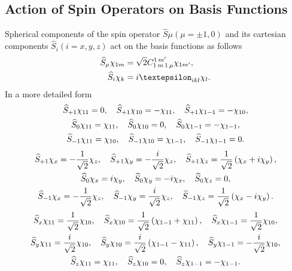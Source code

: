 \subsection{Action of Spin Operators on Basis Functions}\label{sec:6.3.3}
Spherical components of the spin operator $\widehat{S} \mu(\mu= \pm 1,0)$ and its cartesian components $\widehat{S}_{i}(i=x, y, z)$ act on the basis functions as follows
\begin{align}
\widehat{S}_{\mu} \chi_{1 m} & =\sqrt{2} \clebsch{1}{m}{1}{\mu}{1}{m^{\prime}} \chi_{1 m^{\prime}}, \label{eq:6:3:24}\\
\widehat{S}_{i} \chi_{k} & =i \varepsilon_{i k l} \chi_{l} . \notag
\end{align}
In a more detailed form
\begin{gather}
\widehat{S}_{+1} \chi_{11}=0, \quad \widehat{S}_{+1} \chi_{10}=-\chi_{11}, \quad \widehat{S}_{+1} \chi_{1-1}=-\chi_{10}, \notag\\
\widehat{S}_{0} \chi_{11}=\chi_{11}, \quad \widehat{S}_{0} \chi_{10}=0, \quad \widehat{S}_{0} \chi_{1-1}=-\chi_{1-1}, \label{eq:6:3:25}\\
\widehat{S}_{-1} \chi_{11}=\chi_{10}, \quad \widehat{S}_{-1} \chi_{10}=\chi_{1-1}, \quad \widehat{S}_{-1} \chi_{1-1}=0 . \notag
\end{gather}
\begin{gather}
\widehat{S}_{+1} \chi_{x}=-\frac{1}{\sqrt{2}} \chi_{z}, \quad \widehat{S}_{+1} \chi_{y}=-\frac{i}{\sqrt{2}} \chi_{z}, \quad \widehat{S}_{+1} \chi_{z}=\frac{1}{\sqrt{2}}\left(\chi_{x}+i \chi_{y}\right), \notag\\
\widehat{S}_{0} \chi_{x}=i \chi_{y}, \quad \widehat{S}_{0} \chi_{y}=-i \chi_{x}, \quad \widehat{S}_{0} \chi_{z}=0, \label{eq:6:3:26}\\
\widehat{S}_{-1} \chi_{x}=-\frac{1}{\sqrt{2}} \chi_{z}, \quad \widehat{S}_{-1} \chi_{y}=\frac{i}{\sqrt{2}} \chi_{z}, \quad \widehat{S}_{-1} \chi_{z}=\frac{1}{\sqrt{2}}\left(\chi_{x}-i \chi_{y}\right) . \notag
\end{gather}
\begin{gather}
\widehat{S}_{x} \chi_{11}=\frac{1}{\sqrt{2}} \chi_{10}, \quad \widehat{S}_{x} \chi_{10}=\frac{1}{\sqrt{2}}\left(\chi_{1-1}+\chi_{11}\right), \quad \widehat{S}_{x} \chi_{1-1}=\frac{1}{\sqrt{2}} \chi_{10}, \notag\\
\widehat{S}_{y} \chi_{11}=\frac{i}{\sqrt{2}} \chi_{10}, \quad \widehat{S}_{y} \chi_{10}=\frac{i}{\sqrt{2}}\left(\chi_{1-1}-\chi_{11}\right), \quad \widehat{S}_{y} \chi_{1-1}=-\frac{i}{\sqrt{2}} \chi_{10}, \label{eq:6:3:27}\\
\widehat{S}_{z} \chi_{11}=\chi_{11}, \quad \widehat{S}_{z} \chi_{10}=0, \quad \widehat{S}_{z} \chi_{1-1}=-\chi_{1-1} . \notag
\end{gather}
